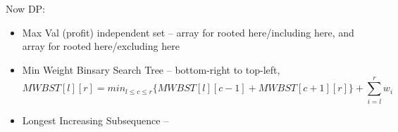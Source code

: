 \documentclass[12pt]{article}
\begin{document}
\pagebreak

Now DP:
\begin{itemize}
  \item Max Val (profit) independent set -- array for rooted here/including here, and array for rooted here/excluding here
  \item Min Weight Binsary Search Tree -- bottom-right to top-left, $$MWBST[l][r] = min_{l\leq c\leq r}\{MWBST[l][c-1] + MWBST[c+1][r]\} + \sum_{i=l}^r w_i$$
  \item Longest Increasing Subsequence --
\end{itemize}
\end{document}
